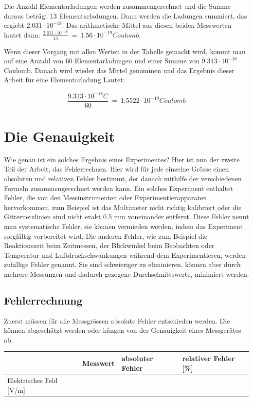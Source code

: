 \par
\noindent Die Anzahl Elementarladungen werden zusammengerechnet und die Summe daraus beträgt 13 Elementarladungen. Dann werden die Ladungen summiert, das ergiebt $2.031 \cdot 10^{-18}$. Das arithmetische Mittel aus diesen beiden Messwerten lautet dann: $\frac{2.031 \cdot 10^{-18}}{13} \ = \ 1.56 \cdot 10^{-19} Coulomb$. 

Wenn dieser Vorgang mit allen Werten in der Tabelle gemacht wird, kommt man auf eine Anzahl von 60 Elementarladungen und einer Summe von $9.313 \cdot 10^{-18}$ Coulomb. Danach wird wieder das Mittel genommen und das Ergebnis dieser Arbeit für eine Elementarladung Lautet:

\begin{equation}\label{eq:ergebnis}
	\frac{9.313 \cdot 10^{-18}C}{60} \ = \ 1.5522 \cdot 10^{-19} Coulomb
\end{equation}

\section{Die Genauigkeit}\label{sec:genauigkeitAuswertung}
Wie genau ist ein solches Ergebnis eines Experimentes? Hier ist nun der zweite Teil der Arbeit, das Fehlerrechnen. Hier wird für jede einzelne Grösse einen absoluten und relativen Fehler bestimmt, der danach mithilfe der verschiedenen Formeln zusammengerechnet werden kann. Ein solches Experiment enthaltet Fehler, die von den Messinstrumenten oder Experimentierapparaten hervorkommen, zum Beispiel ist das Multimeter nicht richtig kalibriert oder die Gitternetzlinien sind nicht exakt 0.5 mm voneinander entfernt. Diese Fehler nennt man systematische Fehler, sie können vermieden werden, indem das Experiment sorgfältig vorbereitet wird. Die anderen Fehler, wie zum Beispiel die Reaktionszeit beim Zeitmessen, der Blickwinkel beim Beobachten oder Temperatur und Luftdruckschwankungen während dem Experimentieren, werden zufällige Fehler genannt. Sie sind schwieriger zu eliminieren, können aber durch mehrere Messungen und dadurch gezogene Durchschnittswerte, minimiert werden. 

\subsection{Fehlerrechnung}\label{sub:fehler}
Zuerst müssen für alle Messgrössen absolute Fehler entschieden werden. Die können abgeschätzt werden oder hängen von der Genauigkeit eines Messgerätes ab.

\begin{center}
	\begin{tabular}[h]{l|lll}
		& Messwert & absoluter Fehler & relativer Fehler [\%] \\
		\toprule
		Elektrisches Feld [V/m] &
	\end{tabular}
\end{center}
